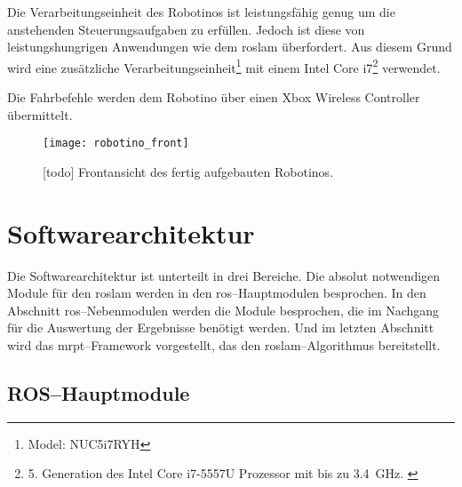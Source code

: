Die Verarbeitungseinheit des Robotinos ist leistungsfähig genug um die anstehenden Steuerungsaufgaben zu erfüllen. Jedoch ist diese von leistungshungrigen Anwendungen wie dem \Gls{roslam} überfordert. Aus diesem Grund wird eine zusätzliche Verarbeitungseinheit\footnote{Model: NUC5i7RYH} mit einem Intel Core i7\footnote{5. Generation des Intel Core i7-5557U Prozessor mit bis zu \SI{3.4}{\GHz}. \cite{intel2015nucproductbrief}} verwendet.

Die Fahrbefehle werden dem Robotino über einen Xbox Wireless Controller übermittelt.

\begin{figure}[h]
	\centering
	\texttt{[image: robotino\_front]}
	\caption{[todo] Frontansicht des fertig aufgebauten Robotinos.}
	\label{fig:robotino_front}
\end{figure}


\begin{comment}
--------------------------------------------------------------------------------
- Kurzbeschreibung der Modulfunktion
- Welche Funktion erfüllt dieses Modul
- Welche ROS-Messages/-Topics/-Services bietet dieses Modul
\end{comment}
\section{Softwarearchitektur}

Die Softwarearchitektur ist unterteilt in drei Bereiche. Die absolut notwendigen Module für den \Gls{roslam} werden in den \Gls{ros}--Hauptmodulen besprochen. In den Abschnitt \Gls{ros}--Nebenmodulen werden die Module besprochen, die im Nachgang für die Auswertung der Ergebnisse benötigt werden. Und im letzten Abschnitt wird das \Gls{mrpt}--Framework vorgestellt, das den \Gls{roslam}--Algorithmus bereitstellt.


\begin{comment}
--------------------------------------------------------------------------------
- Begrifflichkeiten wie Topic, Sessage, Service usw. wurden bereits im Grundlagenkapitel geklärt.
- todo: Grundlagen ROS: URDF--Files, Lauch--Files, TF--Tree (odom, base_link, map?), Wofür braucht man Koordinatensystemtransformationen?
- todo: Übersicht über alle Module und deren Verbindung zu einander?
\end{comment}
\subsection{ROS--Hauptmodule}


